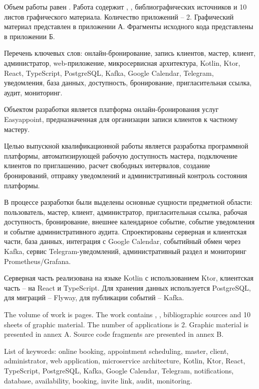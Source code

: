
Объем работы равен . Работа содержит , ,  библиографических источников и 10 листов графического материала. Количество приложений -- 2. Графический материал представлен в приложении А. Фрагменты исходного кода представлены в приложении Б.

Перечень ключевых слов: онлайн-бронирование, запись клиентов, мастер, клиент, администратор, web-приложение, микросервисная архитектура, Kotlin, Ktor, React, TypeScript, PostgreSQL, Kafka, Google Calendar, Telegram, уведомления, база данных, доступность, бронирование, пригласительная ссылка, аудит, мониторинг.

Объектом разработки является платформа онлайн-бронирования услуг Easyappoint, предназначенная для организации записи клиентов к частному мастеру.

Целью выпускной квалификационной работы является разработка программной платформы, автоматизирующей рабочую доступность мастера, подключение клиентов по приглашению, расчет свободных интервалов, создание бронирований, отправку уведомлений и административный контроль состояния платформы.

В процессе разработки были выделены основные сущности предметной области: пользователь, мастер, клиент, администратор, пригласительная ссылка, рабочая доступность, бронирование, внешнее календарное событие, событие уведомления и событие административного аудита. Спроектированы серверная и клиентская части, база данных, интеграция с Google Calendar, событийный обмен через Kafka, сервис Telegram-уведомлений, административный раздел и мониторинг Prometheus/Grafana.

Серверная часть реализована на языке Kotlin с использованием Ktor, клиентская часть -- на React и TypeScript. Для хранения данных используется PostgreSQL, для миграций -- Flyway, для публикации событий -- Kafka.

  
The volume of work is  pages. The work contains , ,  bibliographic sources and 10 sheets of graphic material. The number of applications is 2. Graphic material is presented in annex A. Source code fragments are presented in annex B.

List of keywords: online booking, appointment scheduling, master, client, administrator, web application, microservice architecture, Kotlin, Ktor, React, TypeScript, PostgreSQL, Kafka, Google Calendar, Telegram, notifications, database, availability, booking, invite link, audit, monitoring.

